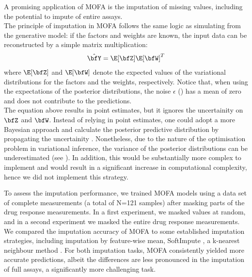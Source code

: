 A promising application of MOFA is the imputation of missing values, including the potential to impute of entire assays.\\
The principle of imputation in MOFA follows the same logic as simulating from the generative model: if the factors and weights are known, the input data can be reconstructed by a simple matrix multiplication:
\[
	\hat{\bfY} = \E[\bfZ] \E[\bfW]^T
\]
where $\E[\bfZ]$ and $\E[\bfW]$ denote the expected values of the variational distributions for the factors and the weights, respectively. Notice that, when using the expectations of the posterior distributions, the noise $\epsilon$ () has a mean of zero and does not contribute to the predictions.\\
The equation above results in point estimates, but it ignores the uncertainity on $\bfZ$ and $\bfW$. Instead of relying in point estimates, one could adopt a more Bayesian approach and calculate the posterior predictive distribution by propagating the uncertainity \cite{Gelman2013}. Nonetheless, due to the nature of the optimisation problem in variational inference, the variance of the posterior distributions can be underestimated (see ). In addition, this would be substantially more complex to implement and would result in a significant increase in computational complexity, hence we did not implement this strategy.

To assess the imputation performance, we trained MOFA models using a data set of complete measurements (a total of N=121 samples) after masking parts of the drug response measurements. In a first experiment, we masked values at random, and in a second experiment we masked the entire drug response measurements. We compared the imputation accuracy of MOFA to some established imputation strategies, including imputation by feature-wise mean, SoftImpute \cite{Mazumder2010}, a k-nearest neighbour method \cite{Troyanskaya2001}. For both imputation tasks, MOFA consistently yielded more accurate predictions, albeit the differences are less pronounced in the imputation of full assays, a significantly more challenging task.\\

